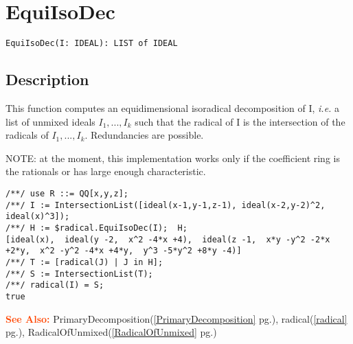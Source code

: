 \documentclass[a4paper]{mybook}
\newenvironment{command}{}{} %
\newcommand\SeeAlso{\par\textcolor{OrangeRed}{\textbf{\large See Also: }}}
\begin{document}
\section{EquiIsoDec}
\label{EquiIsoDec}
\begin{command} %


\begin{Verbatim}[label=syntax, rulecolor=\color{MidnightBlue},
frame=single]
EquiIsoDec(I: IDEAL): LIST of IDEAL
\end{Verbatim}


\subsection*{Description}

This function computes an equidimensional isoradical decomposition of
I, \textit{i.e.} a list of unmixed ideals $I_1,...,I_k$ such that the radical of I
is the intersection of the radicals of $I_1,...,I_k$. Redundancies are
possible.
\par 
NOTE: at the moment, this implementation works only if the coefficient
ring is the rationals or has large enough characteristic.
\begin{Verbatim}[label=example, rulecolor=\color{PineGreen}, frame=single]
/**/ use R ::= QQ[x,y,z];
/**/ I := IntersectionList([ideal(x-1,y-1,z-1), ideal(x-2,y-2)^2, ideal(x)^3]);
/**/ H := $radical.EquiIsoDec(I);  H;
[ideal(x),  ideal(y -2,  x^2 -4*x +4),  ideal(z -1,  x*y -y^2 -2*x +2*y,  x^2 -y^2 -4*x +4*y,  y^3 -5*y^2 +8*y -4)]
/**/ T := [radical(J) | J in H];
/**/ S := IntersectionList(T);
/**/ radical(I) = S;
true
\end{Verbatim}


\SeeAlso %
  PrimaryDecomposition(\ref{PrimaryDecomposition} pg.\pageref{PrimaryDecomposition}), 
    radical(\ref{radical} pg.\pageref{radical}), 
    RadicalOfUnmixed(\ref{RadicalOfUnmixed} pg.\pageref{RadicalOfUnmixed})
\end{command} %
\end{document}
